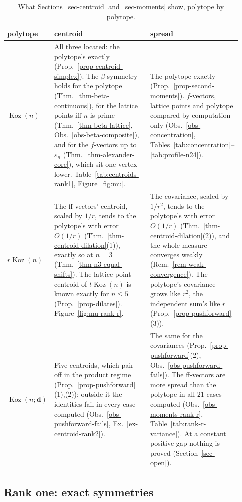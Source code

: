 \documentclass[11pt, a4paper, abstract=yes]{scrartcl}
\theoremstyle{definition}
\theoremstyle{remark}
\theoremstyle{plain}
\newcommand{\vek}[1]{\boldsymbol{#1}}
\theoremstyle{remark}
\theoremstyle{plain}
\newcommand{\Koz}{\operatorname{Koz}}
\begin{document}
\begin{table}[tbp]
\centering\footnotesize
\renewcommand{\arraystretch}{1.15}
\begin{tabular}{@{}p{0.12\linewidth}p{0.42\linewidth}p{0.39\linewidth}@{}}
\toprule
polytope & centroid & spread\\
\midrule
\(\Koz(n)\)
& \raggedright All three located: the polytope's exactly (Prop.~\ref{prop-centroid-simplex}). The
  \(\beta\)-symmetry holds for the polytope (Thm.~\ref{thm-beta-continuous}), for the lattice points
  iff \(n\) is prime (Thm.~\ref{thm-beta-lattice}, Obs.~\ref{obs-beta-composite}), and for the
  \(f\)-vectors up to \(\varepsilon_n\) (Thm.~\ref{thm-alexander-core}), which sit one vertex lower.
  Table~\ref{tab:centroids-rank1}, Figure~\ref{fig:mu}.
& \raggedright The polytope exactly (Prop.~\ref{prop-second-moments}). \(f\)-vectors, lattice points and polytope
  compared by computation only (Obs.~\ref{obs-concentration},
  Tables~\ref{tab:concentration}--\ref{tab:profile-n24}).\tabularnewline[3pt]
\(r\Koz(n)\)
&\raggedright The ff-vectors' centroid, scaled by \(1/r\), tends to the polytope's with error \(O(1/r)\)
  (Thm.~\ref{thm-centroid-dilation}(1)), exactly so at \(n=3\) (Thm.~\ref{thm-n3-equal-shifts}). The
  lattice-point centroid of \(t\Koz(n)\) is known exactly for \(n\le5\) (Prop.~\ref{prop-dilates}).
  Figure~\ref{fig:mu-rank-r}.
& \raggedright The covariance, scaled by \(1/r^2\), tends to the polytope's with error \(O(1/r)\)
  (Thm.~\ref{thm-centroid-dilation}(2)), and the whole measure converges weakly
  (Rem.~\ref{rem-weak-convergence}). The polytope's covariance grows like \(r^2\), the independent
  sum's like \(r\) (Prop.~\ref{prop-pushforward}(3)).\tabularnewline[3pt]
\(\Koz(n;\vek d)\)
& \raggedright Five centroids, which pair off in the product regime (Prop.~\ref{prop-pushforward}(1),(2));
  outside it the identities fail in every case computed (Obs.~\ref{obs-pushforward-fails},
  Ex.~\ref{ex-centroid-rank2}).
& \raggedright The same for the covariances (Prop.~\ref{prop-pushforward}(2), Obs.~\ref{obs-pushforward-fails}).
  The ff-vectors are more spread than the polytope in all \(21\) cases computed
  (Obs.~\ref{obs-moments-rank-r}, Table~\ref{tab:rank-r-variance}). At a constant positive gap
  nothing is proved (Section~\ref{sec-open}).\tabularnewline
\bottomrule
\end{tabular}
\caption{What Sections~\ref{sec-centroid} and~\ref{sec-moments} show, polytope by polytope.}
\label{tab:centroid-summary}
\end{table}
\subsection{Rank one: exact symmetries}
\label{sec:orgb28d9fc}
\end{document}

